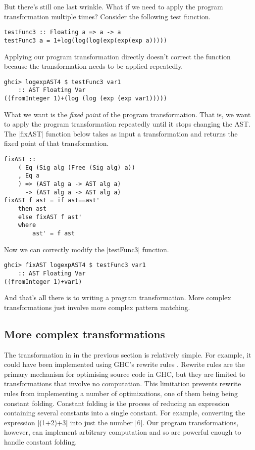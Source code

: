 \documentclass[preprint]{sigplanconf}
\theoremstyle{definition}
\begin{document}
But there's still one last wrinkle.
What if we need to apply the program transformation multiple times?
Consider the following test function.
\begin{lstlisting}
testFunc3 :: Floating a => a -> a
testFunc3 a = 1+log(log(log(exp(exp(exp a)))))
\end{lstlisting}
Applying our program transformation directly doesn't correct the function because the transformation needs to be applied repeatedly.
\begin{lstlisting}
ghci> logexpAST4 $ testFunc3 var1
    :: AST Floating Var
((fromInteger 1)+(log (log (exp (exp var1)))))
\end{lstlisting}
What we want is the \emph{fixed point} of the program transformation.
That is, we want to apply the program transformation repeatedly until it stops changing the AST.
The |fixAST| function below takes as input a transformation and returns the fixed point of that transformation.
\begin{lstlisting}
fixAST ::
    ( Eq (Sig alg (Free (Sig alg) a))
    , Eq a
    ) => (AST alg a -> AST alg a)
      -> (AST alg a -> AST alg a)
fixAST f ast = if ast==ast'
    then ast
    else fixAST f ast'
    where
        ast' = f ast
\end{lstlisting}
Now we can correctly modify the |testFunc3| function.
\begin{lstlisting}
ghci> fixAST logexpAST4 $ testFunc3 var1
    :: AST Floating Var
((fromInteger 1)+var1)
\end{lstlisting}
And that's all there is to writing a program transformation.
More complex transformations just involve more complex pattern matching.

\subsection{More complex transformations}

The transformation in in the previous section is relatively simple.
For example, it could have been implemented using GHC's rewrite rules \cite{jones2001playing}.
Rewrite rules are the primary mechanism for optimising source code in GHC,
but they are limited to transformations that involve no computation.
This limitation prevents rewrite rules from implementing a number of optimizations,
one of them being being constant folding.
Constant folding is the process of reducing an expression containing several constants into a single constant.
For example, converting the expression |(1+2)+3| into just the number |6|.
Our program transformations, however, can implement arbitrary computation and so are powerful enough to handle constant folding.
\end{document}
